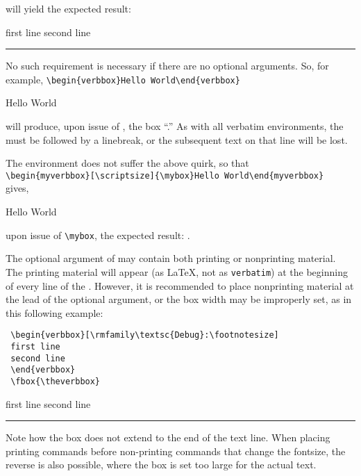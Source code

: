 \documentclass{article}
\newcommand\rl{\rule{1em}{0in}}
\begin{document}
\begin{myverbbox}{\myvb}
will yield the expected result:\\
\begin{verbbox}[\LARGE]
first line
second line
\end{verbbox}
\rl\addvbuffer[3pt 0pt]{\fbox{\theverbbox}}

No such requirement is necessary if there are no optional arguments.
So, for example,
\verb|\begin{verbbox}Hello World\end{verbbox}|
\begin{verbbox}Hello World\end{verbbox} 
will produce, upon issue of \tvb, the box ``\theverbbox.''  As with all
verbatim environments, the {\evbenv} must be followed by a linebreak, or
the subsequent text on that line will be lost.

The {\myvrbox} environment does not suffer the above quirk, so that\\
\verb|\begin{myverbbox}[\scriptsize]{\mybox}Hello World\end{myverbbox}|\\
gives, \begin{myverbbox}[\scriptsize]{\mybox}Hello World\end{myverbbox}
upon issue of \verb|\mybox|, the expected result: \mybox.

The optional argument of {\vrbox} may contain both printing or
nonprinting material.  The printing material will appear (as \LaTeX{},
not as \verb|verbatim|) at the beginning of every line of the \vrbox.
However, it is recommended to place nonprinting material at the lead of
the optional argument, or the box width may be improperly set, as in
this following example:

\begin{verbatim}
 \begin{verbbox}[\rmfamily\textsc{Debug}:\footnotesize]
 first line
 second line
 \end{verbbox}
 \fbox{\theverbbox}
\end{verbatim}
\begin{verbbox}
first line
second line
\end{verbbox}
\rl\fbox{\theverbbox}

Note how the box does not extend to the end of the text line.  When
placing printing commands before non-printing commands that change the
fontsize, the reverse is also possible, where the box is set too large
for the actual text.


\end{myverbbox}
\end{document}
